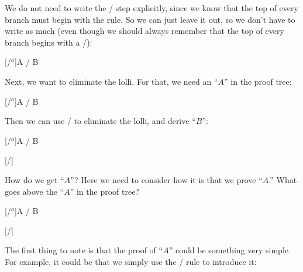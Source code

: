 \documentclass[../../../main.tex]{subfiles}
\begin{document}
\noindent
We do not need to write the \startrule/ step explicitly, since we know that the top of every branch must begin with the  rule. So we can just leave it out, so we don't have to write as much (even though we should always remember that the top of every branch begins with a \startrule/):

\begin{prooftree*}
  \ellipsis{}{}
  [\lolliIntro/$^{a}$]{A \lolli/ B}
\end{prooftree*}

\noindent
Next, we want to eliminate the lolli. For that, we need an ``$A$'' in the proof tree:

\begin{prooftree*}
  \ellipsis{}{}
  [\lolliIntro/$^{a}$]{A \lolli/ B}
  
  \hypo{}
  \ellipsis{}{}
  
\end{prooftree*}

\noindent
Then we can use \lolliElim/ to eliminate the lolli, and derive ``$B$'':

\begin{prooftree*}
  \ellipsis{}{}
  [\lolliIntro/$^{a}$]{A \lolli/ B}
  
  \hypo{}
  \ellipsis{}{}
  
  [\lolliElim/]{}
\end{prooftree*}

\noindent
How do we get ``$A$''? Here we need to consider how it is that we prove ``$A$.'' What goes above the ``$A$'' in the proof tree? 

\begin{prooftree*}
  \ellipsis{}{}
  [\lolliIntro/$^{a}$]{A \lolli/ B}
  
  \ellipsis{}{}
  
  [\lolliElim/]{}
\end{prooftree*}

\noindent
The first thing to note is that the proof of ``$A$'' could be something very simple. For example, it could be that we simply use the \startrule/ rule to introduce it:
\end{document}
